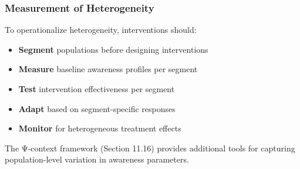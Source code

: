 \subsubsection{Measurement of Heterogeneity}

To operationalize heterogeneity, interventions should:

\begin{itemize}
    \item \textbf{Segment} populations before designing interventions
    \item \textbf{Measure} baseline awareness profiles per segment
    \item \textbf{Test} intervention effectiveness per segment
    \item \textbf{Adapt} based on segment-specific responses
    \item \textbf{Monitor} for heterogeneous treatment effects
\end{itemize}

The Ψ-context framework (Section 11.16) provides additional tools for 
capturing population-level variation in awareness parameters.
